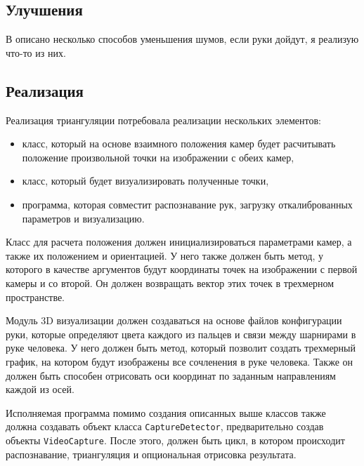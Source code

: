 \documentclass[12pt, a4paper]{article}
\begin{document}
\subsection{Улучшения}
В \cite{multiview_cv} описано несколько способов уменьшения шумов, если руки
дойдут, я реализую что-то из них.

\subsection{Реализация}
Реализация триангуляции потребовала реализации нескольких элементов:
\begin{itemize}
  \item класс, который на основе взаимного положения камер будет расчитывать
    положение произвольной точки на изображении с обеих камер,
  \item класс, который будет визуализировать полученные точки,
  \item программа, которая совместит распознавание рук, загрузку
    откалиброванных параметров и визуализацию.
\end{itemize}

Класс для расчета положения должен инициализироваться параметрами камер, а
также их положением и ориентацией. У него также должен быть метод, у которого в
качестве аргументов будут координаты точек на изображении с первой камеры и со
второй. Он должен возвращать вектор этих точек в трехмерном пространстве. 

Модуль 3D визуализации должен создаваться на основе файлов конфигурации руки,
которые определяют цвета каждого из пальцев и связи между шарнирами в руке
человека. У него должен быть метод, который позволит создать трехмерный график,
на котором будут изображены все сочленения в руке человека. Также он должен
быть способен отрисовать оси координат по заданным направлениям каждой из осей.

Исполняемая программа помимо создания описанных выше классов также должна
создавать объект класса \texttt{CaptureDetector}, предварительно создав объекты
\texttt{VideoCapture}. После этого, должен быть цикл, в котором происходит
распознавание, триангуляция и опциональная отрисовка результата.
\end{document}
